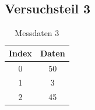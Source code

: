 \documentclass{Praktikum}
\begin{document}
\subsection{Versuchsteil 3}
\begin{table}[H]
    \centering
    \begin{tabular}{|c|c|}
        \hline
        Index & Daten \\\hline
        0 & 50 \\
        1 & 3 \\
        2 & 45\\\hline
    \end{tabular}
    \caption{Messdaten 3}
    \label{tab: MD3}
\end{table}
\end{document}
